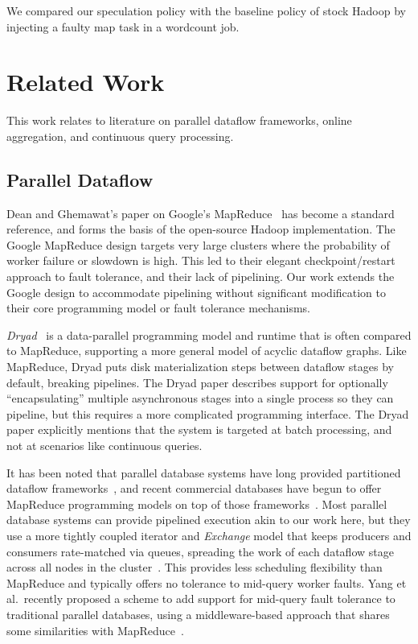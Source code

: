 We compared our speculation policy with the baseline policy of stock Hadoop by injecting a faulty 
map task in a wordcount job. 


\section{Related Work}
\label{ch:hop:sec:relwork}
This work relates to literature on parallel dataflow frameworks, online aggregation, and continuous query processing.

\subsection{Parallel Dataflow}
Dean and Ghemawat's paper on Google's MapReduce~\cite{mapreduce-osdi}
has become a standard reference, and forms the basis of the
open-source Hadoop implementation.  The Google MapReduce design targets very
large clusters where the probability of worker failure or slowdown is
high.  This led to their elegant checkpoint/restart approach to fault
tolerance, and their lack of pipelining.  Our work
extends the Google design to accommodate pipelining without significant
modification to their core programming model or fault tolerance
mechanisms.

\emph{Dryad}~\cite{dryad07} is a data-parallel programming model and runtime
that is often compared to MapReduce, supporting a more general model of acyclic
dataflow graphs.  Like MapReduce, Dryad puts disk materialization steps between
dataflow stages by default, breaking pipelines.  The Dryad paper describes
support for optionally ``encapsulating'' multiple asynchronous stages into a
single process so they can pipeline, but this requires a more complicated
programming interface.
The Dryad paper explicitly mentions that the system is targeted at batch processing, and not at scenarios like continuous queries.  

It has been noted that parallel database systems have long provided partitioned
dataflow frameworks~\cite{pavlo09}, and recent commercial databases have begun
to offer MapReduce programming models on top of those
frameworks~\cite{aster,greenplum}.  Most parallel database systems can provide
pipelined execution akin to our work here, but they use a more tightly coupled
iterator and \emph{Exchange} model that keeps producers and consumers
rate-matched via queues, spreading the work of each dataflow stage across all
nodes in the cluster~\cite{exchange}.  This provides less scheduling flexibility
than MapReduce and typically offers no tolerance to mid-query worker
faults. Yang et al.\ recently proposed a scheme to add support for mid-query
fault tolerance to traditional parallel databases, using a middleware-based
approach that shares some similarities with MapReduce~\cite{osprey-icde}.

